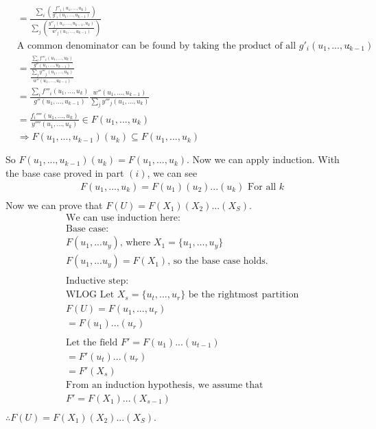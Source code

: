 \documentclass[11pt]{article}
\begin{document}
{\begin{align*}
& = \frac{\sum_i \left( \frac{f''_i(u_1, ..., u_k)}{g'_i(u_1, ..., u_{k-1})} \right)}{ \sum_j \left( \frac{y''_j(u_1, ..., u_{k-1}, u_k)}{w'_j(u_1, ..., u_{k-1})} \right)}\\
&\text{A common denominator can be found by taking the product of all $g'_i(u_1, ..., u_{k-1})$}:\\
& = \frac{ \frac{\sum_i f'''_i(u_1, ..., u_k)}{g''(u_1, ..., u_{k-1})} }{\frac{\sum_j  y'''_j(u_1, ..., u_k)}{w''(u_1, ..., u_{k-1})}}\\
& = \frac{\sum_i f'''_i(u_1, ..., u_k)}{g''(u_1, ..., u_{k-1})} \frac{w''(u_1, ..., u_{k-1})}{\sum_j  y'''_j(u_1, ..., u_k)}\\
& = \frac{f_i''''(u_1, ..., u_k)}{y''''(u_1, ..., u_k)} \in F(u_1, ..., u_k)\\
&\Rightarrow F(u_1, ..., u_{k-1})(u_k) \subseteq F(u_1, ..., u_k)\\\\
\end{align*}
So $F(u_1, ..., u_{k-1})(u_k) = F(u_1, ..., u_k)$. Now we can apply induction. With the base case proved in part $(i)$, we can see
\begin{align*}
&F(u_1, ..., u_k) = F(u_1)(u_2)...(u_k) \text{ For all $k$}\\
\end{align*}
Now we can prove that $F(U) = F(X_1)(X_2)...(X_S)$.
\begin{align*}
&\text{We can use induction here:}\\
&\text{Base case:}\\
&F(u_1, ... u_y)\text{, where $X_1 = \{u_1, ..., u_y\}$}\\
&F(u_1, ... u_y) = F(X_1) \text{, so the base case holds.}\\
&\\
&\text{Inductive step:}\\
&\text{WLOG Let }X_s = \{u_t, ..., u_r\} \text{ be the rightmost partition}\\
&F(U) = F(u_1, ..., u_r)\\
&= F(u_1)...(u_r)\\
&\\
&\text{Let the field $F' = F(u_1)...(u_{t-1})$ }\\
& = F'(u_t)...(u_r)\\
& = F'(X_s)\\
&\text{From an induction hypothesis, we assume that }\\
&F' = F(X_1)...(X_{s-1})\\
\end{align*}
$\therefore F(U) = F(X_1)(X_2)...(X_S)$.
}
\end{document}
